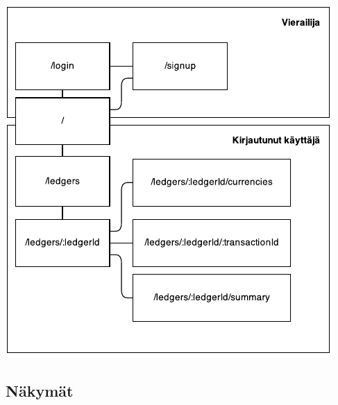 \documentclass[a4paper]{scrartcl}
\begin{document}
\includegraphics[scale=1.5]{ui}

\subsection{Näkymät}
\end{document}
